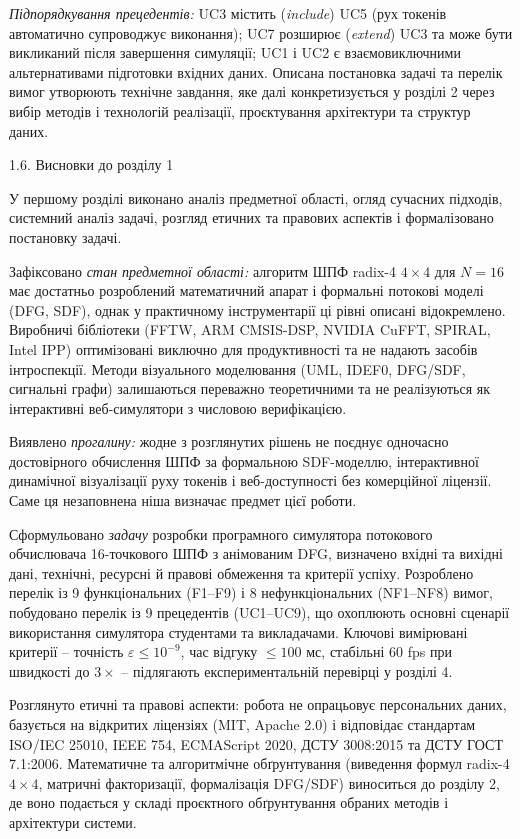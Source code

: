 \documentclass[
]{article}
\begin{document}
\emph{Підпорядкування прецедентів:} UC3 містить (\emph{include}) UC5
(рух токенів автоматично супроводжує виконання); UC7 розширює
(\emph{extend}) UC3 та може бути викликаний після завершення симуляції;
UC1 і UC2 є взаємовиключними альтернативами підготовки вхідних даних.
Описана постановка задачі та перелік вимог утворюють технічне завдання,
яке далі конкретизується у розділі 2 через вибір методів і технологій
реалізації, проєктування архітектури та структур даних.

\protect{}\label{X075676d46328bd1f3c167fb2e80b0be216d8f0b}{}1.6.
Висновки до розділу 1

У першому розділі виконано аналіз предметної області, огляд сучасних
підходів, системний аналіз задачі, розгляд етичних та правових аспектів
і формалізовано постановку задачі.

Зафіксовано \emph{стан предметної області:} алгоритм ШПФ radix-4
\(4 \times 4\) для \(N = 16\) має достатньо розроблений математичний
апарат і формальні потокові моделі (DFG, SDF), однак у практичному
інструментарії ці рівні описані відокремлено. Виробничі бібліотеки
(FFTW, ARM CMSIS-DSP, NVIDIA CuFFT, SPIRAL, Intel IPP) оптимізовані
виключно для продуктивності та не надають засобів інтроспекції. Методи
візуального моделювання (UML, IDEF0, DFG/SDF, сигнальні графи)
залишаються переважно теоретичними та не реалізуються як інтерактивні
веб-симулятори з числовою верифікацією.

Виявлено \emph{прогалину:} жодне з розглянутих рішень не поєднує
одночасно достовірного обчислення ШПФ за формальною SDF-моделлю,
інтерактивної динамічної візуалізації руху токенів і веб-доступності без
комерційної ліцензії. Саме ця незаповнена ніша визначає предмет цієї
роботи.

Сформульовано \emph{задачу} розробки програмного симулятора потокового
обчислювача 16-точкового ШПФ з анімованим DFG, визначено вхідні та
вихідні дані, технічні, ресурсні й правові обмеження та критерії успіху.
Розроблено перелік із 9 функціональних (F1--F9) і 8 нефункціональних
(NF1--NF8) вимог, побудовано перелік із 9 прецедентів (UC1--UC9), що
охоплюють основні сценарії використання симулятора студентами та
викладачами. Ключові вимірювані критерії -- точність
\(\varepsilon \leq 10^{- 9}\), час відгуку \(\leq 100\) мс, стабільні 60
fps при швидкості до \(3 \times\) -- підлягають експериментальній
перевірці у розділі 4.

Розглянуто етичні та правові аспекти: робота не опрацьовує персональних
даних, базується на відкритих ліцензіях (MIT, Apache 2.0) і відповідає
стандартам ISO/IEC 25010, IEEE 754, ECMAScript 2020, ДСТУ 3008:2015 та
ДСТУ ГОСТ 7.1:2006. Математичне та алгоритмічне обґрунтування (виведення
формул radix-4 \(4 \times 4\), матричні факторизації, формалізація
DFG/SDF) виноситься до розділу 2, де воно подається у складі проєктного
обґрунтування обраних методів і архітектури системи.
\end{document}
